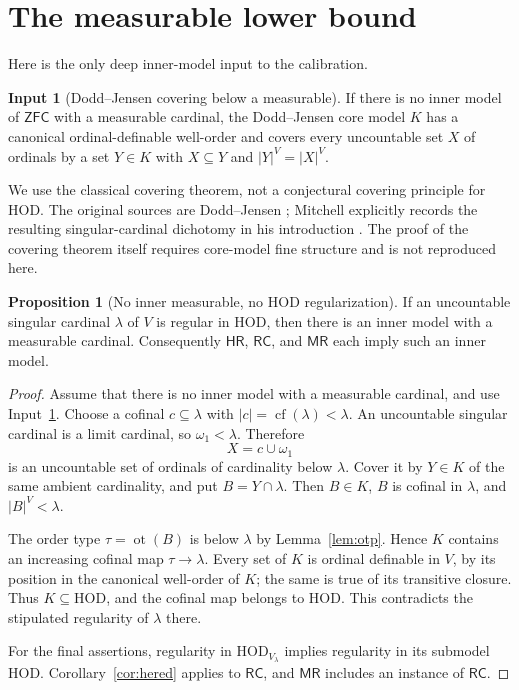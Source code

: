 \documentclass[11pt,letterpaper]{article}
\theoremstyle{definition}
\newtheorem{proposition}[definition]{Proposition}
\newtheorem{inputthm}{Input}
\numberwithin{equation}{section}
\newcommand{\ZFC}{\mathsf{ZFC}}
\newcommand{\HOD}{\mathrm{HOD}}
\newcommand{\cf}{\operatorname{cf}}
\newcommand{\ot}{\operatorname{ot}}
\newcommand{\RC}{\mathsf{RC}}
\newcommand{\MR}{\mathsf{MR}}
\newcommand{\HR}{\mathsf{HR}}
\begin{document}
\section{The measurable lower bound}\label{sec:lower}

Here is the only deep inner-model input to the calibration.

\begin{inputthm}[Dodd--Jensen covering below a measurable]\label{input:dj}
If there is no inner model of $\ZFC$ with a measurable cardinal, the
Dodd--Jensen core model $K$ has a canonical ordinal-definable well-order
and covers every uncountable set $X$ of ordinals by a set $Y\in K$ with
$X\subseteq Y$ and $|Y|^V=|X|^V$.
\end{inputthm}

We use the classical covering theorem, not a conjectural covering principle
for $\HOD$. The original sources are Dodd--Jensen \cite{DJK,DJLU};
Mitchell explicitly records the resulting singular-cardinal dichotomy in
his introduction \cite{Mitchell}. The proof of the covering theorem itself
requires core-model fine structure and is not reproduced here.

\begin{proposition}[No inner measurable, no HOD regularization]\label{prop:lower}
If an uncountable singular cardinal $\lambda$ of $V$ is regular in
$\HOD$, then there is an inner model with a measurable cardinal.
Consequently $\HR$, $\RC$, and $\MR$ each imply such an inner model.
\end{proposition}
\begin{proof}
Assume that there is no inner model with a measurable cardinal, and use
Input~\ref{input:dj}. Choose a cofinal $c\subseteq\lambda$ with
$|c|=\cf(\lambda)<\lambda$. An uncountable singular cardinal is a limit
cardinal, so $\omega_1<\lambda$. Therefore
\[
 X=c\cup\omega_1
\]
is an uncountable set of ordinals of cardinality below $\lambda$.
Cover it by $Y\in K$ of the same ambient cardinality, and put
$B=Y\cap\lambda$. Then $B\in K$, $B$ is cofinal in $\lambda$, and
$|B|^V<\lambda$.

The order type $\tau=\ot(B)$ is below $\lambda$ by
Lemma~\ref{lem:otp}. Hence $K$ contains an increasing cofinal map
$\tau\to\lambda$. Every set of $K$ is ordinal definable in $V$, by its
position in the canonical well-order of $K$; the same is true of its
transitive closure. Thus $K\subseteq\HOD$, and the cofinal map belongs to
$\HOD$. This contradicts the stipulated regularity of $\lambda$ there.

For the final assertions, regularity in $\HOD_{V_\lambda}$ implies
regularity in its submodel $\HOD$. Corollary~\ref{cor:hered} applies to
$\RC$, and $\MR$ includes an instance of $\RC$.
\end{proof}
\end{document}
